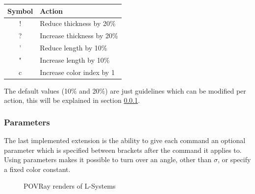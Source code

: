 \documentclass[11pt,a4paper]{article}
\begin{document}
\begin{center}
\begin{tabular}{c | l}
Symbol & Action \\ \hline
! & Reduce thickness by 20\% \\
? & Increase thickness by 20\% \\
' & Reduce length by 10\% \\
" & Increase length by 10\% \\
c & Increase color index by 1
\end{tabular}
\end{center}

The default values (10\% and 20\%) are just guidelines which can be modified per action, this will be explained in section \ref{parameters}.


\subsubsection{Parameters}
\label{parameters}
The last implemented extension is the ability to give each command an optional parameter which is specified between brackets after the command it applies to. Using parameters makes it possible to turn over an angle, other than $\sigma$, or specify a fixed color constant.

\begin{figure}[h!]
  \centering
  \caption{POVRay renders of L-Systems}
  \label{fig:povrenders}
\end{figure}
\end{document}
